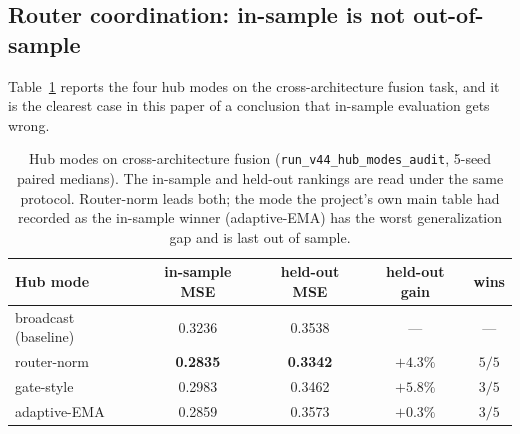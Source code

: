\documentclass[10pt]{article}
\theoremstyle{definition}
\theoremstyle{plain}
\theoremstyle{remark}
\begin{document}
\subsection{Router coordination: in-sample is not out-of-sample}
\label{sec:hub-exp}

Table~\ref{tab:hub} reports the four hub modes on the cross-architecture fusion task, and it is the clearest case in this paper of a conclusion that in-sample evaluation gets wrong.

\begin{table}[htbp]
\centering
\caption{Hub modes on cross-architecture fusion (\texttt{run\_v44\_hub\_modes\_audit}, 5-seed paired medians). The in-sample and held-out rankings are read under the same protocol. Router-norm leads both; the mode the project's own main table had recorded as the in-sample winner (adaptive-EMA) has the worst generalization gap and is last out of sample.}
\label{tab:hub}
\small
\setlength{\tabcolsep}{5pt}
\begin{tabular}{lcccc}
\toprule
\textbf{Hub mode} & \textbf{in-sample MSE} & \textbf{held-out MSE} & \textbf{held-out gain} & \textbf{wins} \\
\midrule
broadcast (baseline) & 0.3236 & 0.3538 & --- & --- \\
router-norm & \textbf{0.2835} & \textbf{0.3342} & $+4.3\%$ & $5/5$ \\
gate-style & 0.2983 & 0.3462 & $+5.8\%$ & $3/5$ \\
adaptive-EMA & 0.2859 & 0.3573 & $+0.3\%$ & $3/5$ \\
\bottomrule
\end{tabular}
\end{table}
\end{document}
